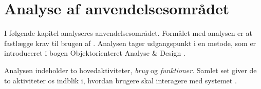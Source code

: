 \chapter{Analyse af anvendelsesområdet}
\label{chap:analyseafao}

I følgende kapitel analyseres anvendelsesområdet. Formålet med analysen er at fastlægge krav til brugen af \Foodl{}. Analysen tager udgangspunkt i en metode, som er introduceret i bogen Objektorienteret Analyse \& Design \cite[s. ~113]{ooad}. 

Analysen indeholder to hovedaktiviteter, \textit{brug} og \textit{funktioner}. Samlet set giver de to aktiviteter os indblik i, hvordan brugere skal interagere med systemet %
\cite[s. ~115]{ooad}.




